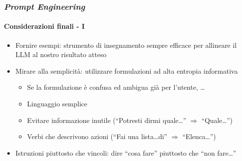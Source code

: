 \begin{frame}[t]
{\begin{minipage}[t]{\textwidth}
\begin{itemize}[leftmargin=50pt,align=right]
\begin{itemize}[leftmargin=15pt,align=right]
            \end{itemize}
        \end{itemize}
    \end{minipage}
}
\end{frame}
%
\begin{frame}[t] \frametitle{\emph{Prompt Engineering}}
\framesubtitle{Considerazioni finali - I}
{\footnotesize
    \begin{minipage}[t]{\textwidth}
        \begin{itemize}[leftmargin=10pt,align=right]
            \item[\alert{\alert{\faArrowCircleRight}}] \alert{Fornire esempi:} strumento di insegnamento sempre efficace per allineare il LLM al nostro risultato atteso
            \item[\alert{\alert{\faArrowCircleRight}}] \alert{Mirare alla semplicità:} utilizzare formulazioni ad alta entropia informativa
            \begin{itemize}[leftmargin=10pt,align=right]
                \item[\alert{\alert{\faArrowCircleRight}}] Se la formulazione è confusa ed ambigua già per l'utente, \ldots
                \item[\alert{\alert{\faArrowCircleRight}}] Linguaggio semplice
                \item[\alert{\alert{\faArrowCircleRight}}] Evitare informazione inutile (``Potresti dirmi quale\ldots'' $\Rightarrow$ ``Quale\ldots'')
                \item[\alert{\alert{\faArrowCircleRight}}] Verbi che descrivono azioni (``Fai una lista\ldots di'' $\Rightarrow$ ``Elenca\ldots'')
            \end{itemize}
            \item[\alert{\faArrowCircleRight}] \alert{Istruzioni piuttosto che vincoli:} dire ``cosa fare'' piuttosto che ``non fare\ldots''
            \begin{itemize}[leftmargin=10pt,align=right]

\end{itemize}
\end{itemize}
\end{minipage}}
\end{frame}

